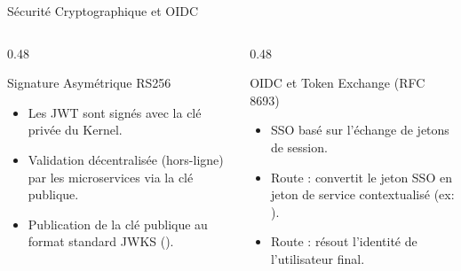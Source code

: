 \documentclass[10pt,aspectratio=169]{beamer}
\begin{document}
\begin{frame}{Sécurité Cryptographique et OIDC}
  \begin{columns}[T]
    \begin{column}{0.48\textwidth}
      \begin{block}{Signature Asymétrique RS256}
        \begin{itemize}
          \item Les JWT sont signés avec la clé privée du Kernel.
          \item Validation décentralisée (hors-ligne) par les microservices via la clé publique.
          \item Publication de la clé publique au format standard JWKS ().
        \end{itemize}
      \end{block}
    \end{column}
    \begin{column}{0.48\textwidth}
      \begin{block}{OIDC et Token Exchange (RFC 8693)}
        \begin{itemize}
          \item SSO basé sur l'échange de jetons de session.
          \item Route  : convertit le jeton SSO en jeton de service contextualisé (ex: ).
          \item Route  : résout l'identité de l'utilisateur final.
        \end{itemize}
      \end{block}
    \end{column}
  \end{columns}
\end{frame}
\end{document}
